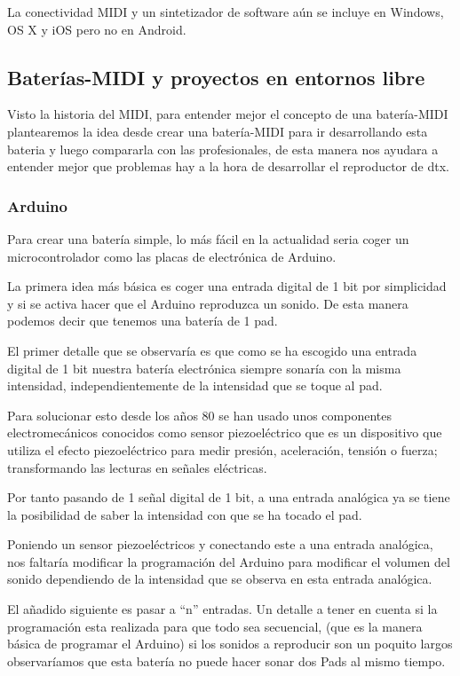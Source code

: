 \documentclass[a4paper,11pt,oneside]{book}
\begin{document}
La conectividad MIDI y un sintetizador de software aún se incluye en Windows, OS X y iOS pero no en Android.


\subsection{Baterías-MIDI y proyectos en entornos libre}

Visto la historia del MIDI, para entender mejor el concepto de una batería-MIDI plantearemos la idea desde crear una batería-MIDI para ir desarrollando esta bateria y luego compararla con las profesionales, de esta manera nos ayudara a entender mejor que problemas hay a la hora de desarrollar el reproductor de dtx.


\subsubsection{Arduino}


Para crear una batería simple, lo más fácil en la actualidad seria coger un microcontrolador como las placas de electrónica de Arduino. 

La primera idea más básica es coger una entrada digital de 1 bit por simplicidad y si se activa hacer que el Arduino reproduzca un sonido.
De esta manera podemos decir que tenemos una batería de 1 pad.

El primer detalle que se observaría  es que como se ha escogido una entrada digital de 1 bit nuestra batería electrónica siempre sonaría con la misma intensidad, independientemente de la intensidad que se toque al pad.

Para solucionar esto desde los años 80 se han usado unos componentes electromecánicos conocidos como sensor piezoeléctrico que es un dispositivo que utiliza el efecto piezoeléctrico para medir presión, aceleración, tensión o fuerza; transformando las lecturas en señales eléctricas.


Por tanto pasando de 1 señal digital de 1 bit, a una entrada analógica ya se tiene la posibilidad de saber la intensidad con que se ha tocado el pad.

Poniendo un sensor piezoeléctricos y conectando este a una entrada analógica, nos faltaría modificar la programación del Arduino para modificar el volumen del sonido dependiendo de la intensidad que se observa en esta entrada analógica.


El añadido siguiente es pasar a ``n'' entradas. Un detalle a tener en cuenta si la programación esta realizada para que todo sea secuencial, (que es la manera básica de programar el Arduino)  si los sonidos a reproducir son un poquito largos observaríamos que esta batería no puede hacer sonar dos \gls{Pads} al mismo tiempo.
\end{document}
